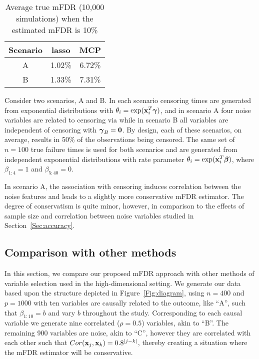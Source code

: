 \begin{table}[b!]
 \caption{Average true mFDR (10,000 simulations) when the estimated mFDR is 10\%}
\centering
\begin{tabular}{c | c c}
  \hline
 Scenario & lasso & MCP   \\  [0.5ex]
  \hline 
   A & 1.02\% & 6.72\% \\ 
   B &  1.33\% & 7.31\% \\ 
   \hline
\end{tabular}
\end{table}

Consider two scenarios, A and B. In each scenario censoring times are generated from exponential distributions with $\theta_{i} = \exp(\mathbf{x}_i^T \boldsymbol{\gamma})$, and in scenario A four noise variables are related to censoring via
while in scenario B all variables are independent of censoring with $\boldsymbol{\gamma}_B = \mathbf{0}$.  By design, each of these scenarios, on average, results in 50\% of the observations being censored.  The same set of $n = 100$ true failure times is used for both scenarios and are generated from independent exponential distributions with rate parameter $\theta_i = \exp(\mathbf{x}_i^T \boldsymbol{\beta})$, where $\beta_{1:4} = 1$ and $\beta_{5:40} = 0$.

In scenario A, the association with censoring induces correlation between the noise features and leads to a slightly more conservative mFDR estimator. The degree of conservatism is quite minor, however, in comparison to the effects of sample size and correlation between noise variables studied in Section~\ref{Sec:accuracy}.

\subsection{Comparison with other methods}
\label{Sec:sim-comp}

In this section, we compare our proposed mFDR approach with other methods of variable selection used in the high-dimensional setting. We generate our data based upon the structure depicted in Figure~\ref{Fig:diagram}, using $n = 400$ and $p = 1000$ with ten variables are causally related to the outcome, like ``A'', such that $\beta_{1:10} = b$ and vary $b$ throughout the study. Corresponding to each causal variable we generate nine correlated ($\rho = 0.5$) variables, akin to ``B''. The remaining 900 variables are noise, akin to ``C'', however they are correlated with each other such that $Cor(\mathbf{x}_j,\mathbf{x}_k) = 0.8^{|j - k|}$, thereby creating a situation where the mFDR estimator will be conservative.

